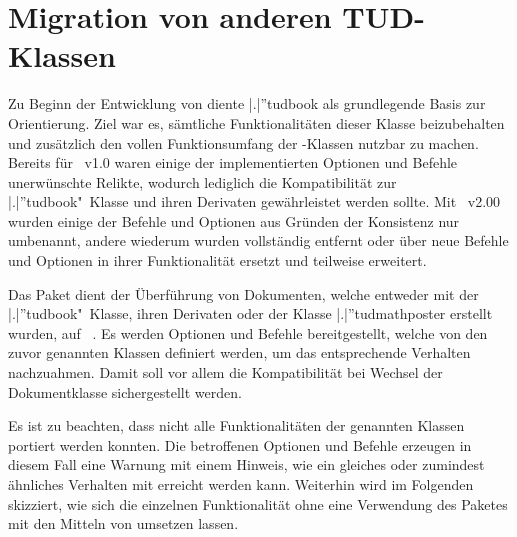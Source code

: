 \section[%
  Das Paket \Package{tudscrcomp} -- Migration von anderen TUD-Klassen%
]{%
  Migration von anderen TUD-Klassen%
}
\begin{DeclareEntity}{}
\begin{NoIndexDefault}
Zu Beginn der Entwicklung von \TUDScript diente \Class|.|''{tudbook} als 
grundlegende Basis zur Orientierung. Ziel war es, sämtliche Funktionalitäten 
dieser Klasse beizubehalten und zusätzlich den vollen Funktionsumfang der 
\KOMAScript-Klassen nutzbar zu machen. Bereits für \TUDScript~v1.0 waren einige 
der implementierten Optionen und Befehle unerwünschte Relikte, wodurch 
lediglich die Kompatibilität zur \Class|.|''{tudbook}"~Klasse und ihren 
Derivaten gewährleistet werden sollte. Mit \TUDScript~v2.00 wurden einige der 
Befehle und Optionen aus Gründen der Konsistenz nur umbenannt, andere wiederum 
wurden vollständig entfernt oder über neue Befehle und Optionen in ihrer 
Funktionalität ersetzt und teilweise erweitert. 

Das Paket  dient der Überführung von Dokumenten, welche
entweder mit der \Class|.|''{tudbook}"~Klasse, ihren Derivaten oder der Klasse 
\Class|.|''{tudmathposter} erstellt wurden, auf \TUDScript~\vTUDScript{}. Es 
werden Optionen und Befehle bereitgestellt, welche von den zuvor genannten 
Klassen definiert werden, um das entsprechende Verhalten nachzuahmen. Damit 
soll vor allem die Kompatibilität bei Wechsel der Dokumentklasse sichergestellt 
werden. 
%
\begin{quoting}
\end{quoting}
%
Es ist zu beachten, dass nicht alle Funktionalitäten der genannten Klassen 
portiert werden konnten. Die betroffenen Optionen und Befehle erzeugen in 
diesem Fall eine Warnung mit einem Hinweis, wie ein gleiches oder zumindest 
ähnliches Verhalten mit \TUDScript erreicht werden kann. Weiterhin wird im 
Folgenden skizziert, wie sich die einzelnen Funktionalität ohne eine Verwendung 
des Paketes  mit den Mitteln von \TUDScript umsetzen 
lassen. 


\end{NoIndexDefault}
\end{DeclareEntity}

